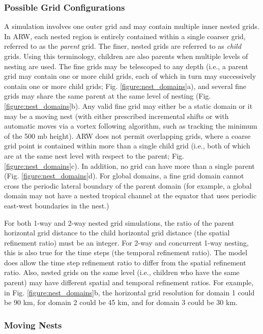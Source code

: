 \subsubsection{Possible Grid Configurations}

A simulation involves one outer grid and may contain multiple
inner nested grids.  In ARW, each nested region is entirely
contained within 
a single coarser grid, referred to as the {\em parent}
grid.  The finer, nested grids are referred to as {\em child} grids.
Using this terminology, children are also parents when multiple levels
of nesting are used.  The fine grids may be telescoped to any depth (i.e., 
a
parent grid may contain one or more child grids, each of which in turn
may successively contain one or more child grids; Fig.
\ref{figure:nest_domains}a), and several fine grids may share the
same parent at the same level of nesting (Fig.
\ref{figure:nest_domains}b).  
Any valid fine grid may either be a static domain or it may be a moving nest
(with either prescribed incremental shifts or with automatic moves
via a vortex following algorithm, such as tracking the minimum of the 500 mb height).  
ARW does not permit overlapping
grids, where a coarse grid point is contained within more than a
single child grid (i.e., both of which are at the same nest level with respect
to the parent; Fig. \ref{figure:nest_domains}c).  In addition, no grid can have
more than a single parent (Fig. \ref{figure:nest_domains}d).  For global domains, a
fine grid domain cannot cross the periodic lateral boundary of the parent domain
(for example, a global domain may not have a nested tropical channel at the 
equator that uses periodic east-west boundaries in the nest.)

For both 1-way and 2-way nested grid simulations, the ratio of the
parent horizontal grid distance to the child horizontal grid distance
(the spatial refinement ratio) must be an integer.  For 2-way and concurrent 1-way
nesting, this is also true for
the time steps (the temporal refinement ratio).  The model does allow
the time step refinement ratio to differ from the spatial refinement
ratio.  Also, nested grids on the same level (i.e., children who have the
same parent) may have different spatial and temporal refinement ratios.  For example,
in Fig. \ref{figure:nest_domains}b, the horizontal grid resolution for 
domain 1 could be 90 km, for
domain 2 could be 45 km, and for domain 3 could be 30 km.

\subsubsection{Moving Nests}

